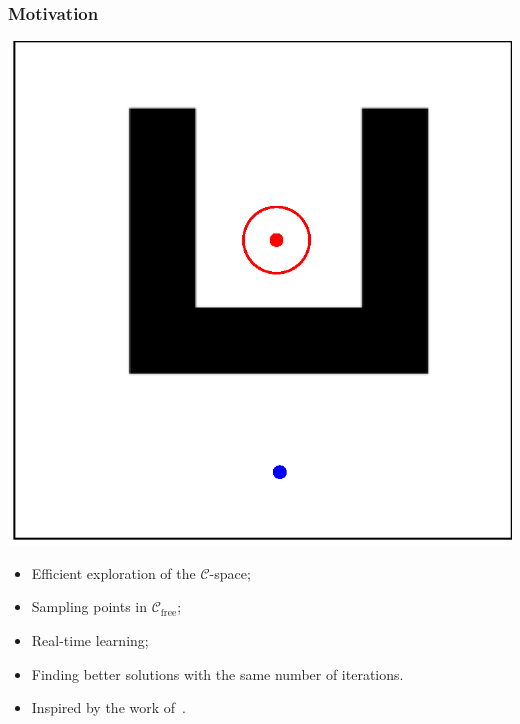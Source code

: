 \documentclass{beamer}
\begin{document}
\begin{frame}
	\frametitle{Motivation}	
	\noindent
	\begin{minipage}[t]{0.49\textwidth}
	  \vspace{0pt}
	  \includegraphics[width=\textwidth]{figChap4/SimpleMaze.eps} 
	\end{minipage}
	\hfill
	\begin{minipage}[t]{0.49\textwidth}
	  \vspace{0.5cm}
	  \vfill
    \begin{center} %
      \begin{itemize}
        \item Efficient exploration of the \(\mathcal{C}\)-space;
        \vspace{0.2cm}
        \item Sampling points in \(\mathcal{C}_\text{free}\);
        \vspace{0.2cm}
		\item Real-time learning;
        \vspace{0.2cm}
		\item Finding better solutions with the same number of iterations.
		\vspace{0.2cm}
		\item Inspired by the work of~\cite{arslan2015machine}.
      \end{itemize}
    \end{center}
    \vfill
	\end{minipage}
  \end{frame}
\end{document}
